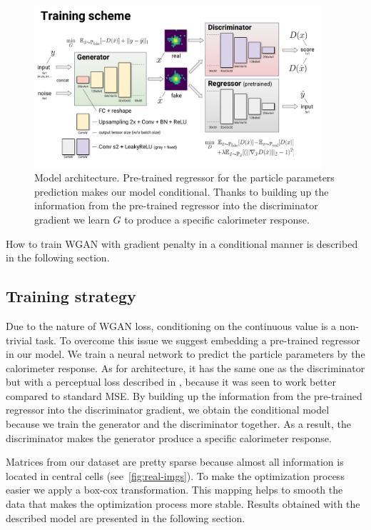 \begin{figure}
\centering
\includegraphics[width=0.95\textwidth]{figures/model_architecture.pdf}
\caption{Model architecture. Pre-trained regressor for the particle parameters prediction makes our model conditional. Thanks to building up the information from the pre-trained regressor into the discriminator gradient we learn $G$ to produce a specific calorimeter response.}\label{fig:model}
\end{figure}

How to train WGAN with gradient penalty in a conditional manner is described in the following section.

\subsection{Training strategy} \label{sec:training_strategy}
Due to the nature of WGAN loss, conditioning on the continuous value is a non-trivial task. To overcome this issue we suggest embedding a pre-trained regressor in our model. We train a neural network to predict the particle parameters by the calorimeter response. As for architecture, it has the same one as the discriminator but with a perceptual loss described in \cite{johnson2016perceptual}, because it was seen to work better compared to standard MSE. By building up the information from the pre-trained regressor into the discriminator gradient, we obtain the conditional model because we train the generator and the discriminator together. As a result, the discriminator makes the generator produce a specific calorimeter response.

Matrices from our dataset are pretty sparse because almost all information is located in central cells (see~\cref{fig:real-imgs}). To make the optimization process easier we apply a box-cox transformation. This mapping helps to smooth the data that makes the optimization process more stable.
Results obtained with the described model are presented in the following section.

